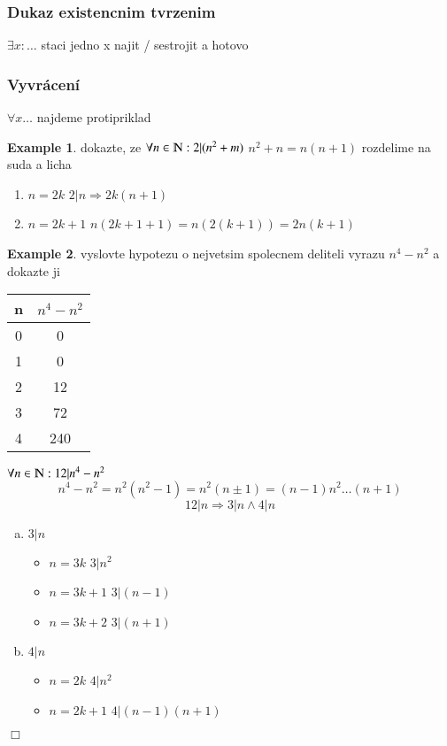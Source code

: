 \documentclass{article}
\theoremstyle{definition}
\newtheorem{exmp}{Example}[section]
\begin{document}
\subsubsection{Dukaz existencnim tvrzenim}
$\exists x: \dots$ staci jedno x najit / sestrojit a hotovo
\subsubsection{Vyvrácení}
$\forall x \dots$ najdeme protipriklad

\begin{exmp}

    dokazte, ze $\forall n \in \varmathbb{N}: 2|(n^2+m)$
    $n^2 +n = n (n+1)$
    rozdelime na suda a licha
    \begin{enumerate}

        \item $n = 2k$
            $2|n \Rightarrow 2k(n+1)$

        \item $n = 2k+1$
            $n(2k+1+1) = n(2(k+1))=2n(k+1)$

    \end{enumerate}

\end{exmp}

\begin{exmp}

    vyslovte hypotezu o nejvetsim spolecnem deliteli vyrazu $n^4 - n^2$ a dokazte ji
    \begin{center}
\begin{tabular}{c | c}
    n & $n^4 - n^2$ \\
    \hline
    0 & 0 \\
    1 & 0 \\
    2 & 12 \\
    3 & 72 \\
    4 & 240
\end{tabular}
    \end{center}
$\forall n \in \varmathbb{N}: 12 | n^4-n^2$
\[n^4-n^2 = n^2(n^2-1)=n^2(n\pm1) = (n-1)n^2\dots(n+1) \]
\[12 | n \Rightarrow 3|n \land 4|n \]
\begin{enumerate}[a)]

    \item $ 3|n $
        \begin{itemize}
            \item $n = 3k$
                $3|n^2$
            \item $n = 3k+1$
                $3|(n-1)$
            \item $n= 3k+2$
                $3|(n+1)$
    \end{itemize}
\item $4|n$
    \begin {itemize}
\item $n = 2k $
$4|n^2$
\item $n = 2k+1 $
    $4|(n-1)(n+1)$
\end{itemize}


\end{enumerate}
$\Box$

\end{exmp}
\end{document}
